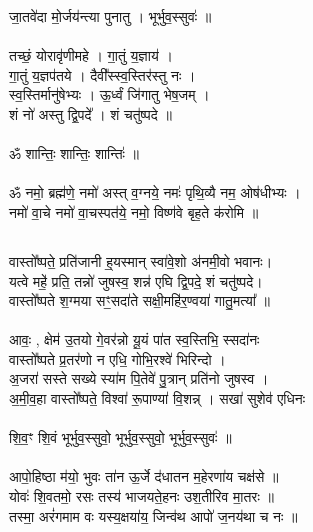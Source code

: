 जा॒तवे॑दा मो॒र्जय॑न्त्या पुनातु । भूर्भुव॒स्सुवः॑ ॥\\
\\
तच्छं॒ योरावृ॑णीमहे । गा॒तुं य॒ज्ञाय॑ ।\\
गा॒तुं य॒ज्ञप॑तये । दैवी᳚स्स्व॒स्तिर॑स्तु नः । \\
स्व॒स्तिर्मानु॑षेभ्यः । ऊ॒र्ध्वं जि॑गातु भेष॒जम् ।\\
शं नो॑ अस्तु द्वि॒पदे᳚ । शं चतु॑ष्पदे ॥\\
\\
ॐ शान्तिः॒ शान्तिः॒ शान्तिः॑ ॥\\
\\
ॐ नमो॒ ब्रह्म॑णे॒ नमो॑ अस्त् व॒ग्नये॒ नमः॑ पृथि॒व्यै नम॒ ओष॑धीभ्यः ।\\
नमो॑ वा॒चे नमो॑ वा॒चस्पत॑ये॒ नमो॒ विष्ण॑वे बृह॒ते क॑रोमि ॥\\
\subsection{}
वास्तो᳚ष्पते॒ प्रति॑जानी ह्॒यस्मान्  स्वा॑वे॒शो अ॑नमी॒वो भवानः। \\
यत्वे महे॒॑ प्रति॒ तन्नो॑ जुषस्व॒ शन्न॑ एघि द्वि॒पदे॒ शं चतु॑ष्पदे। \\
वास्तो᳚ष्पते श॒ग्मया सꣳ॒सदा॑ते सक्षी॒महि॑र॒ण्वया॑ गातु॒मत्या᳚ ॥\\
\\
आवः॒ , क्षेम॑ उ॒तयो गे॒वर॑न्नो यू॒यं पा॑त स्व॒स्तिभि॒ स्सदा॑नः \\
वास्तो᳚ष्पते प्र॒तर॑णो न एधि॒ गोभि॒रश्वे॑ भिरिन्दो ।\\
अ॒जरा॑ सस्ते सख्ये स्या॑म पि॒तेवे॑ पु॒त्रान् प्रति॑नो जुषस्व ।\\
अ॒मी॒व॒हा वास्तो᳚ष्पते॒ विश्वा॑ रू॒पाण्या॑ वि॒शन्न् । सखा॑ सुशेव॑ एधिनः \\
\\
शि॒व॒ꣳ शि॒वं भूर्भुव॒स्सुवो॒ भूर्भुव॒स्सुवो॒ भूर्भुव॒स्सुवः॑ ॥\\
\\
आपो॒हिष्ठा म॑यो॒ भुवः ता॑न ऊ॒र्जे द॑धातन म॒हेरणा॑य चक्ष॑से ॥\\
योवः॑ शि॒वतमो॒ रसः तस्य॑ भाजयते॒हनः उश॒तीरिव मा॒तरः ॥\\
तस्मा॒ अरं॑गमाम वः यस्य॒क्षया॑य॒ जिन्व॑थ आपो॑ ज॒नय॑था च नः ॥\\
